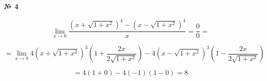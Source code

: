 \documentclass{article}
\begin{document}
\textbf{№ 4} 

\begingroup
\Large

$$ \lim\limits_{x\to 0} \frac{(x+\sqrt{1+x^2})^4 - (x-\sqrt{1+x^2})^4}{x}
= \frac{0}{0}
= $$

$$ = \lim\limits_{x\to 0} 4(x+\sqrt{1+x^2})^3 \left( 1+\frac{2x}{2\sqrt{1+x^2}} \right) - 4(x-\sqrt{1+x^2})^3 \left( 1-\frac{2x}{2\sqrt{1+x^2}} \right) $$

$$ = 4(1+0) - 4(-1)(1-0) 
= 8 
$$

\endgroup
\end{document}
